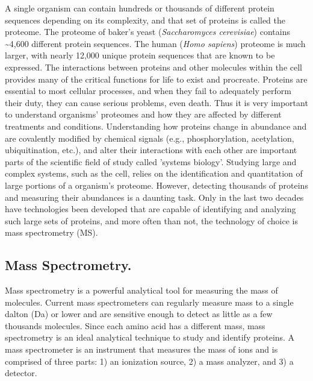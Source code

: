 A single organism can contain hundreds or thousands of different protein sequences depending on its complexity, and that set of proteins is called the proteome. The proteome of baker's yeast (\emph{Saccharomyces cerevisiae}) contains \textasciitilde4,600 different protein sequences. The human (\emph{Homo sapiens}) proteome is much larger, with nearly 12,000 unique protein sequences that are known to be expressed. The interactions between proteins and other molecules within the cell provides many of the critical functions for life to exist and procreate. Proteins are essential to most cellular processes, and when they fail to adequately perform their duty, they can cause serious problems, even death. Thus it is very important to understand organisms' proteomes and how they are affected by different treatments and conditions. Understanding how proteins change in abundance and are covalently modified by chemical signals (e.g., phosphorylation, acetylation, ubiquitination, etc.), and alter their interactions with each other are important parts of the scientific field of study called 'systems biology'. Studying large and complex systems, such as the cell, relies on the identification and quantitation of large portions of a organism's proteome. However, detecting thousands of proteins and measuring their abundances is a daunting task. Only in the last two decades have technologies been developed that are capable of identifying and analyzing such large sets of proteins, and more often than not, the technology of choice is mass spectrometry (MS). 

\subsection*{Mass Spectrometry.}
Mass spectrometry is a powerful analytical tool for measuring the mass of molecules. Current mass spectrometers can regularly measure mass to a single dalton (Da) or lower and are sensitive enough to detect as little as a few thousands molecules. Since each amino acid has a different mass, mass spectrometry is an ideal analytical technique to study and identify proteins. A mass spectrometer is an instrument that measures the mass of ions and is comprised of three parts: 1) an ionization source, 2) a mass analyzer, and 3) a detector. 

